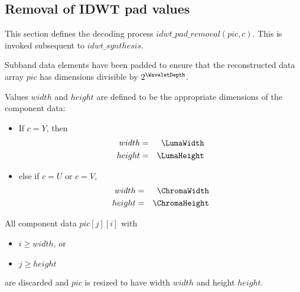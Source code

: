 \clearpage
\subsection{Removal of IDWT pad values}
\label{paddingremoval}

This section defines the decoding process $idwt\_pad\_removal(pic, c)$. This
is invoked subsequent to $idwt\_synthesis$.

Subband data elements have been padded to ensure that the reconstructed 
data array $pic$ has dimensions divisible by $2^\WaveletDepth$.

Values $width$ and $height$ are defined to be the appropriate dimensions
of the component data:

\begin{itemize}
\item If $c=Y$, then
\begin{eqnarray*}
width & =& \LumaWidth \\
height & =& \LumaHeight
\end{eqnarray*}
\item else if $c=U$ or $c=V$,
\begin{eqnarray*}
width & =& \ChromaWidth \\
height & =& \ChromaHeight
\end{eqnarray*}
\end{itemize}

All component data $pic[j][i]$ with

\begin{itemize}
\item $i\geq width$, or
\item $j\geq height$
\end{itemize}

are discarded and $pic$ is resized to have width $width$ and height $height$.

